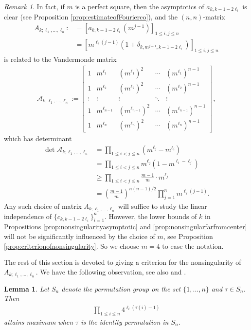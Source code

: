 \documentclass[11pt,letterpaper,reqno]{amsart}
\numberwithin{figure}{section}
\numberwithin{table}{section}
\theoremstyle{definition}
\theoremstyle{plain}
\newtheorem{lemma}[theorem]{Lemma}
\theoremstyle{definition}
\theoremstyle{definition}
\theoremstyle{remark}
\newtheorem{remark}{Remark}[section]
\numberwithin{equation}{section}
\theoremstyle{remark}
\begin{document}
\begin{remark}
    In fact, if $m$ is a perfect square, then the asymptotics of $a_{k,k-1-2\ell_i}$ is clear (see Proposition \ref{prop:estimateofFourierco}), and the $(n,n)$-matrix  
    \begin{align}A_{k;\ell_1,...,\ell_n}:&=\left[a_{k,k-1-2\ell_i}(m^{j-1})\right]_{1\leq i,j\leq n}\\&=\left[m^{\ell_i(j-1)}(1+\delta_{k,m^{j-1},k-1-2\ell_i})\right]_{1\leq i,j\leq n}\end{align}
    is related to the Vandermonde matrix
\begin{align}
\mathscr{A}_{k;\ell_1,...,\ell_n}:=\begin{bmatrix}
        1 & m^{\ell_1} & (m^{\ell_1})^2 & \cdots & (m^{\ell_1})^{n-1}\\
        1 & m^{\ell_2} & (m^{\ell_2})^2 & \cdots & (m^{\ell_2})^{n-1}\\
        \vdots & \vdots & \vdots & \ddots & \vdots\\
        1 & m^{\ell_{n-1}} & (m^{\ell_{n-1}})^2 & \cdots & (m^{\ell_{n-1}})^{n-1}\\ 
        1 & m^{\ell_n} & (m^{\ell_n})^2 & \cdots & (m^{\ell_n})^{n-1}
    \end{bmatrix},\end{align}
which has determinant
\begin{align}
    \det\mathscr{A}_{k;\ell_1,...,\ell_n}&=\prod_{1\leq i<j\leq n}(m^{\ell_j}-m^{\ell_i})\\&=\prod_{1\leq i<j\leq n}m^{\ell_j}(1-m^{\ell_i-\ell_j})\\&\geq\prod_{1\leq i<j\leq n}\frac{m-1}{m} \cdot m^{\ell_j}\\&=\left(\frac{m-1}{m}\right)^{n(n-1)/2}\prod_{j=1}^nm^{\ell_j(j-1)}.
\end{align}
Any such choice of matrix $A_{k;\ell_1,...,\ell_n}$ will suffice to study the linear independence of $\{c_{k,k-1-2\ell_i}\}_{i=1}^{n}$. However, the lower bounds of $k$ in Propositions \ref{prop:nonsingularityasymptotic} and \ref{prop:nonsingularfarfromcenter} will not be significantly influenced by the choice of $m$, see Proposition \ref{prop:criterionofnonsingularity}. So we choose $m=4$ to ease the notation. 
\end{remark}The rest of this section is devoted to giving a criterion for the nonsingularity of $A_{k;\ell_1,...,\ell_n}$.
We have the following observation, see also \cite[Lemma 2.4]{oddperiods} and \cite[Corollary 2.5]{oddperiods}.
\begin{lemma}\label{lem:maxofsimplefactorofdet}Let $S_n$ denote the permutation group on the set $\{1,...,n\}$ and $\tau\in S_n$. Then 
\begin{align}
    \prod_{1\leq i\leq n}4^{\ell_i(\tau(i)-1)}
\end{align}
attains maximum when $\tau$ is the identity permutation in $S_n$.    
\end{lemma}
\end{document}
